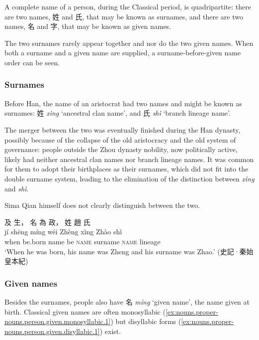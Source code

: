 \documentclass[UTF8, a4paper, oneside, scheme=plain, 12pt]{ctexrep}
\newcommand{\form}[1]{\emph{#1}}
\newcommand{\translate}[1]{`#1'}
\newcommand*{\category}[1]{\textsc{#1}}
\begin{document}
A complete name of a person, during the Classical period, is quadripartite:
there are two names, 姓 and 氏, that may be known as surnames,
and there are two names, 名 and 字, that may be known as given names.

The two surnames rarely appear together and nor do the two given names.
When both a surname and a given name are supplied,
a surname-before-given name order can be seen.

\subsubsection{Surnames}

Before Han, the name of an aristocrat had two names and might be known as surnames:
姓 \form{xìng} \translate{ancestral clan name}, and 氏 \form{shì} \translate{branch lineage name}.

The merger between the two was eventually finished during the Han dynasty,
possibly because of the collapse of the old aristocracy and the old system of governance:
people outside the Zhou dynasty nobility, now politically active,
likely had neither ancestral clan names nor branch lineage names.
It was common for them to adopt their birthplaces as their surnames,
which did not fit into the double surname system,
leading to the elimination of the distinction between \form{xìng} and \form{shì}.

Sima Qian himself does not clearly distinguish between the two.

\begin{exe}
    \ex
    \glll 及 生， 名 為 政， 姓 趙 氏 \\
    jí shēng míng wéi Zhèng xìng Zhào shì \\
    when be.born name be \category{name} surname \category{name} lineage \\
    \glt\translate{When he was born, his name was Zheng and his surname was Zhao.} \hfill (史記·秦始皇本紀)
\end{exe}

\subsubsection{Given names}\label{sec:nouns.proper-nouns.person-names.given-names}

Besides the surnames, people also have 名 \form{míng} \translate{given name},
the name given at birth.
Classical given names are often monosyllabic (\ref{ex:nouns.proper-nouns.person.given.monosyllabic.1}) but disyllabic forms (\ref{ex:nouns.proper-nouns.person.given.disyllabic.1}) exist.
\end{document}
